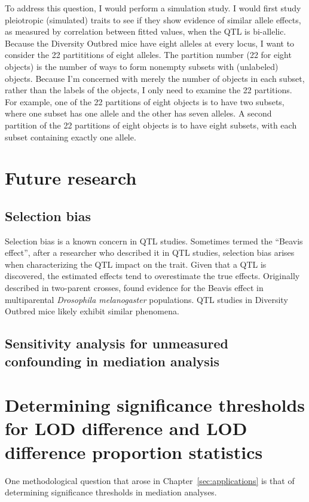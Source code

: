 To address this question, I would perform a simulation study. I would first study pleiotropic (simulated) traits to see if they show evidence of similar allele effects, as measured by correlation between fitted values, when the QTL is bi-allelic. Because the Diversity Outbred mice have eight alleles at every locus, I want to consider the 22 partititions of eight alleles. The partition number (22 for eight objects) is the number of ways to form nonempty subsets with (unlabeled) objects. Because I'm concerned with merely the number of objects in each subset, rather than the labels of the objects, I only need to examine the 22 partitions. For example, one of the 22 partitions of eight objects is to have two subsets, where one subset has one allele and the other has seven alleles. A second partition of the 22 partitions of eight objects is to have eight subsets, with each subset containing exactly one allele.


\section{Future research}


\subsection{Selection bias}

Selection bias is a known concern in QTL studies. Sometimes termed the ``Beavis effect'', after a researcher who described it in QTL studies, selection bias arises when characterizing the QTL impact on the trait. Given that a QTL is discovered, the estimated effects tend to overestimate the true effects. Originally described in two-parent crosses, \citet{king2017beavis} found evidence for the Beavis effect in multiparental \emph{Drosophila melanogaster} populations. QTL studies in Diversity Outbred mice likely exhibit similar phenomena. 



\subsection{Sensitivity analysis for unmeasured confounding in mediation analysis}




\section{Determining significance thresholds for LOD difference and LOD difference proportion statistics}

One methodological question that arose in Chapter~\ref{sec:applications} is that of determining significance thresholds in mediation analyses.



